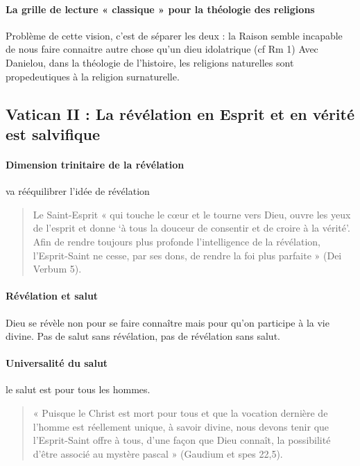 \paragraph{La grille de lecture « classique » pour la théologie des religions }
Problème de cette vision, c’est de séparer les deux : la Raison semble incapable de nous faire connaitre autre chose qu’un dieu idolatrique (cf Rm 1)
Avec Danielou, dans la théologie de l’histoire, les religions naturelles sont propedeutiques à la religion surnaturelle.
 


\subsection{Vatican II : La révélation en Esprit et en vérité est salvifique}
 
 

\paragraph{ Dimension trinitaire de la révélation }



va rééquilibrer l'idée de révélation
\begin{quote}
    Le Saint-Esprit « qui touche le cœur et le tourne vers Dieu, ouvre les yeux de l’esprit et donne ‘à tous la douceur de consentir et de croire à la vérité’. Afin de rendre toujours plus profonde l’intelligence de la révélation, l’Esprit-Saint ne cesse, par ses dons, de rendre la foi plus parfaite » (Dei Verbum 5). 
\end{quote}
\paragraph{Révélation et salut }
Dieu se révèle non pour se faire connaître mais pour qu'on participe à la vie divine. Pas de salut sans révélation, pas de révélation sans salut. 



\paragraph{Universalité du salut } le salut est pour tous les hommes. 
\begin{quote}
      « Puisque le Christ est mort pour tous et que la vocation dernière de l’homme est réellement unique, à savoir divine, nous devons tenir que l’Esprit-Saint offre à tous, d’une façon que Dieu connaît, la possibilité d’être associé au mystère pascal » (Gaudium et spes 22,5). 
\end{quote}

